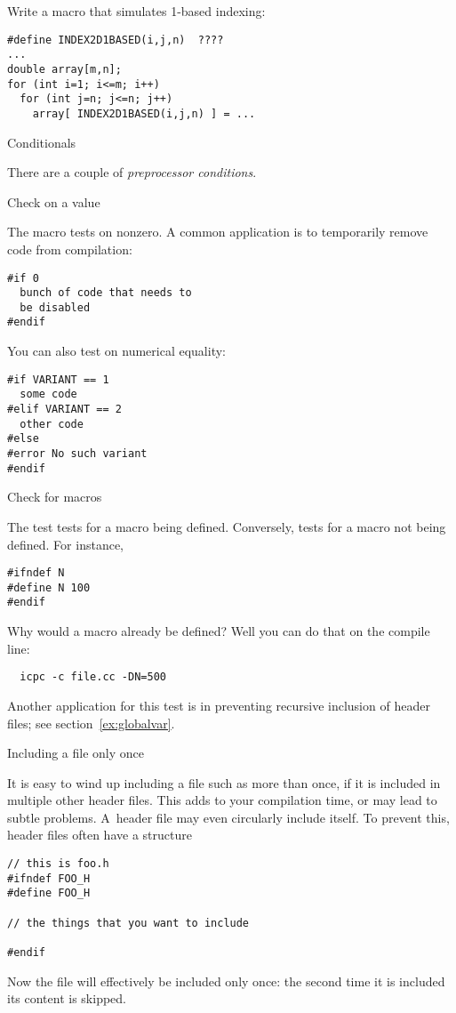\begin{exercise}
  Write a macro that simulates 1-based indexing:
\begin{lstlisting}
#define INDEX2D1BASED(i,j,n)  ????
...
double array[m,n];
for (int i=1; i<=m; i++)
  for (int j=n; j<=n; j++)
    array[ INDEX2D1BASED(i,j,n) ] = ...
\end{lstlisting}
\end{exercise}


 {Conditionals}


There are a couple of \emph{preprocessor conditions}.

 {Check on a value}

The  macro tests on nonzero. A common application is to
temporarily remove code from compilation:
\begin{lstlisting}
#if 0
  bunch of code that needs to
  be disabled
#endif
\end{lstlisting}

You can also test on numerical equality:
\begin{lstlisting}
#if VARIANT == 1
  some code
#elif VARIANT == 2
  other code
#else
#error No such variant
#endif
\end{lstlisting}

 {Check for macros}

The 
test tests for a macro being defined. Conversely,
tests for a macro not being defined. For instance,
\begin{lstlisting}
#ifndef N
#define N 100
#endif
\end{lstlisting}
Why would a macro already be defined? Well you can do that on the
compile line:
\begin{lstlisting}
  icpc -c file.cc -DN=500
\end{lstlisting}

Another application for this test is in preventing recursive inclusion
of header files; see section~\ref{ex:globalvar}.


 {Including a file only once}

It is easy to wind up including a file such as  more than
once, if it is included in multiple other header files. This adds to
your compilation time, or may lead to subtle problems. A~header file
may even circularly include itself. To prevent this, header files
often have a structure%
\begin{lstlisting}
// this is foo.h
#ifndef FOO_H
#define FOO_H

// the things that you want to include

#endif
\end{lstlisting}
Now the file will effectively be included only once: the second time
it is included its content is skipped.

